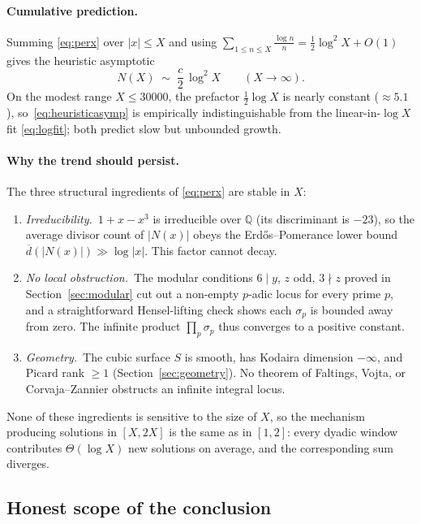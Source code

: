 \documentclass[12pt,a4paper]{article}
\theoremstyle{definition}
\newcommand{\Q}{\mathbb{Q}}
\begin{document}
\paragraph{Cumulative prediction.}  Summing \eqref{eq:perx} over
$|x|\le X$ and using $\sum_{1\le n\le X}\frac{\log n}{n}=\tfrac12\log^2 X+O(1)$
gives the heuristic asymptotic
\begin{equation}
  N(X)\;\sim\;\frac{c}{2}\,\log^2 X\qquad(X\to\infty).
  \label{eq:heuristicasymp}
\end{equation}
On the modest range $X\le 30000$, the prefactor $\tfrac12\log X$ is
nearly constant ($\approx 5.1$), so~\eqref{eq:heuristicasymp} is
empirically indistinguishable from the linear-in-$\log X$ fit
\eqref{eq:logfit}; both predict slow but unbounded growth.

\paragraph{Why the trend should persist.}  The three structural
ingredients of \eqref{eq:perx} are stable in $X$:
\begin{enumerate}
  \item \emph{Irreducibility.}\ $1+x-x^3$ is irreducible over $\Q$
    (its discriminant is $-23$), so the average divisor count of
    $|N(x)|$ obeys the Erd\H{o}s--Pomerance lower bound
    $\overline{d}(|N(x)|)\gg \log|x|$.  This factor cannot decay.
  \item \emph{No local obstruction.}\ The modular conditions
    $6\mid y$, $z$ odd, $3\nmid z$ proved in
    Section~\ref{sec:modular} cut out a non-empty $p$-adic locus for
    every prime $p$, and a straightforward Hensel-lifting check shows
    each $\sigma_p$ is bounded away from zero.  The infinite product
    $\prod_p\sigma_p$ thus converges to a positive constant.
  \item \emph{Geometry.}\ The cubic surface $S$ is smooth, has
    Kodaira dimension $-\infty$, and Picard rank $\ge 1$
    (Section~\ref{sec:geometry}).  No theorem of Faltings,
    Vojta, or Corvaja--Zannier obstructs an infinite integral locus.
\end{enumerate}
None of these ingredients is sensitive to the size of $X$, so the
mechanism producing solutions in $[X,2X]$ is the same as in
$[1,2]$: every dyadic window contributes $\Theta(\log X)$ new
solutions on average, and the corresponding sum diverges.

\subsection{Honest scope of the conclusion}
\end{document}
